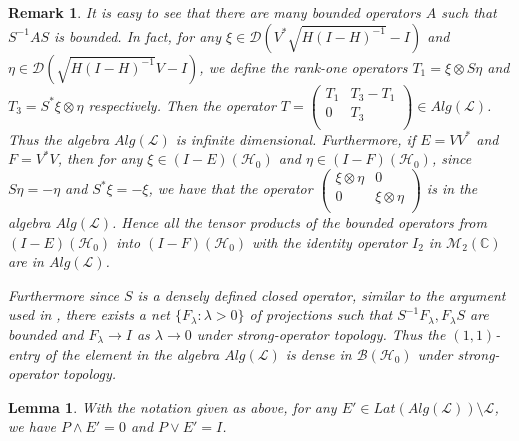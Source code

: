 \documentclass{jaums}
\theoremstyle{thmit} %
\newtheorem{lemma}[theorem]{Lemma}
\theoremstyle{thmrm} %
\newtheorem{remark}{Remark}
\begin{document}
\begin{remark} It is easy to see that there are many bounded operators $A$ such
that $S^{-1}AS$ is bounded. In fact, for any $\xi\in
\mathcal{D}(V^*\sqrt{H(I-H)^{-1}}-I)$
and $\eta\in\mathcal{D}(\sqrt{H(I-H)^{-1}}V-I)$, we define the rank-one
operators $T_1=\xi\otimes S\eta$
and $T_3=S^*\xi\otimes\eta$ respectively. Then the operator $T=\left(
      \begin{array}{cc}
        T_1   &    T_3-T_1  \\
        0     &    T_3      \\
      \end{array}
    \right)\in Alg(\mathcal{L})$.
Thus the algebra $Alg(\mathcal{L})$ is infinite dimensional.
Furthermore, if $E=VV^{*}$ and $F=V^{*}V$, then for any $\xi\in
(I-E)(\mathcal{H}_0)$ and $\eta\in
(I-F)(\mathcal{H}_0)$,
since $S\eta=-\eta$ and $S^*\xi=-\xi$, we have that the operator $\left(
      \begin{array}{cc}
        \xi\otimes\eta   &    0                   \\
        0                &    \xi\otimes\eta      \\
      \end{array}
    \right)$ is in the algebra $Alg(\mathcal{L})$.
Hence all the tensor products of the bounded operators from
$(I-E)(\mathcal{H}_0)$ into $(I-F)(\mathcal{H}_0)$ with the identity operator
$I_2$ in $\mathcal{M}_2(\mathbb{C})$ are in $Alg(\mathcal{L})$.

Furthermore since $S$ is a densely defined closed operator, similar to the
argument used in {\cite{[HY]}}, there
exists a net $\{F_{\lambda}:\lambda>0\}$ of projections such that
$S^{-1}F_{\lambda}, F_{\lambda}S$ are bounded and $F_{\lambda}\rightarrow I$
as $\lambda\rightarrow 0$ under strong-operator topology. Thus the $(1,1)$-entry
of the element in the algebra
$Alg(\mathcal{L})$ is dense in $\mathcal{B}(\mathcal{H}_0)$ under
strong-operator topology.
\end{remark}

\begin{lemma} With the notation given as above, for any $E'\in
Lat(Alg(\mathcal{L}))\setminus\mathcal{L}$, we have $P\wedge E'=0$ and $P\vee
E'=I$.
\end{lemma}
\end{document}
